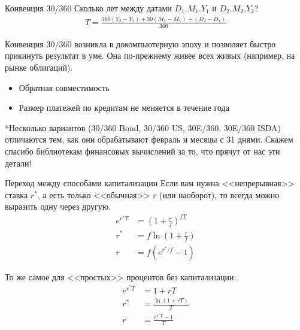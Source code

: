 \documentclass{beamer}
\begin{document}
\begin{frame}{Конвенция 30/360}
\justify
Сколько лет между датами $D_1.M_1.Y_1$ и $D_2.M_2.Y_2$?
\begin{align*}
T = \frac{360(Y_2-Y_1) + 30(M_2-M_1) + (D_2-D_1)}{360}
\end{align*}

\justify
Конвенция 30/360 возникла в докомпьютерную эпоху и позволяет быстро прикинуть результат в уме. Она по-прежнему живее всех живых (например, на рынке облигаций).
\begin{itemize}
\item Обратная совместимость
\item Размер платежей по кредитам не меняется в течение года
\end{itemize}

\vspace{\baselineskip}
\justify
*Несколько вариантов (30/360 Bond, 30/360 US, 30E/360, 30E/360 ISDA) отличаются тем, как они обрабатывают февраль и месяцы с 31 днями. Скажем спасибо библиотекам финансовых вычислений за то, что прячут от нас эти детали!
\end{frame}



\begin{frame}{Переход между способами капитализации}
\justify
Если вам нужна <<непрерывная>> ставка $r^*$, а есть только <<обычная>> $r$ (или наоборот), то всегда можно выразить одну через другую.
\begin{align*}
e^{r^*T} &= \left(1 + \frac{r}{f}\right)^{fT} \\
r^* &= f\ln \left(1 + \frac{r}{f}\right) \\
r &= f\left(e^{r^*/f} - 1\right)
\end{align*}

\justify
То же самое для <<простых>> процентов без капитализации:
\begin{align*}
e^{r^*T} &= 1+rT \\
r^* &= \frac{\ln(1+rT)}{T} \\
r &= \frac{e^{r^*T}-1}{T}
\end{align*}

\end{frame}
\end{document}
